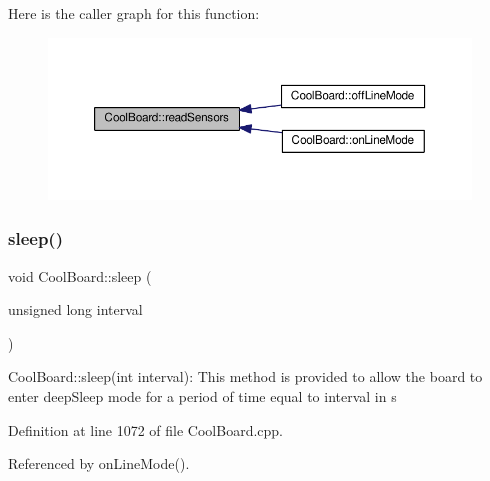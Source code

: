 Here is the caller graph for this function\+:
\nopagebreak
\begin{figure}[H]
\begin{center}
\leavevmode
\includegraphics[width=350pt]{classCoolBoard_ad03abdce2e65f520bbf2cff0f2d083cf_icgraph}
\end{center}
\end{figure}
\mbox{\label{classCoolBoard_a069952cdcb2e7f68518aa429eceadb6e}} 
\subsubsection{\texorpdfstring{sleep()}{sleep()}}
{\footnotesize\ttfamily void Cool\+Board\+::sleep (\begin{DoxyParamCaption}\item[{unsigned long}]{interval }\end{DoxyParamCaption})}

Cool\+Board\+::sleep(int interval)\+: This method is provided to allow the board to enter deep\+Sleep mode for a period of time equal to interval in s 

Definition at line 1072 of file Cool\+Board.\+cpp.



Referenced by on\+Line\+Mode().



